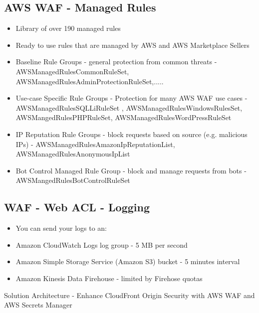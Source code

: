 \subsection{AWS WAF - Managed Rules}
\begin{itemize}
    \item Library of over 190 managed rules
    \item Ready to use rules that are managed by AWS and AWS Marketplace Sellers

    \item Baseline Rule Groups - general protection from common threats
    - AWSManagedRulesCommonRuleSet, AWSManagedRulesAdminProtectionRuleSet,.....
    \item Use-case Specific Rule Groups - Protection for many AWS WAF use cases
    - AWSManagedRulesSQLLiRuleSet , AWSManagedRulesWindowsRulesSet, AWSMangedRulesPHPRuleSet, AWSManagedRulesWordPressRuleSet
    \item IP Reputation Rule Groups - block requests based on source (e.g. malicious IPs)
    - AWSManagedRulesAmazonIpReputationList, AWSManagedRulesAnonymousIpList
    \item Bot Control Managed Rule Group - block and manage requests from bots
    - AWSMangedRulesBotControlRuleSet
\end{itemize}

\subsection{WAF - Web ACL - Logging}
\begin{itemize}
    \item You can send your logs to an:
    \item Amazon CloudWatch Logs log group - 5 MB per second
    \item Amazon Simple Storage Service (Amazon S3) bucket - 5 minutes interval
    \item Amazon Kinesis Data Firehouse - limited by Firehose quotas
\end{itemize}


Solution Architecture - Enhance CloudFront Origin
Security with AWS WAF and AWS Secrets Manager



